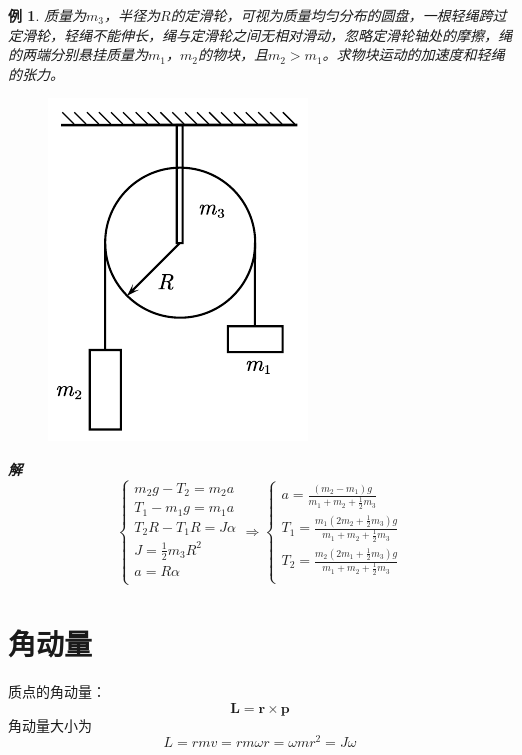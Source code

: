 \documentclass[12pt, a4paper, twoside]{ctexbook}
\newtheorem{example}[theorem]{例}
\begin{document}
\begin{example}
    质量为$m_3$，半径为$R$的定滑轮，可视为质量均匀分布的圆盘，一根轻绳跨过定滑轮，轻绳不能伸长，绳与定滑轮之间无相对滑动，忽略定滑轮轴处的摩擦，绳的两端分别悬挂质量为$m_1$，$m_2$的物块，且$m_2>m_1$。求物块运动的加速度和轻绳的张力。
    \begin{figure}[H]
        \centerline{\includegraphics[scale=0.8]{CH03EX02.pdf}}
    \end{figure}
    \noindent\textbf{解}
    $$
    \left\{ \begin{array}{l}
        m_2g-T_2=m_2a\\
        T_1-m_1g=m_1a\\
        T_2R-T_1R=J\alpha\\
        J=\frac{1}{2}m_3R^2\\
        a=R\alpha\\
    \end{array} \right. \Rightarrow 
    \left\{ \begin{array}{l}
        a=\frac{\left( m_2-m_1 \right) g}{m_1+m_2+\frac{1}{2}m_3}\\
        T_1=\frac{m_1\left( 2m_2+\frac{1}{2}m_3 \right) g}{m_1+m_2+\frac{1}{2}m_3}\\
        T_2=\frac{m_2\left( 2m_1+\frac{1}{2}m_3 \right) g}{m_1+m_2+\frac{1}{2}m_3}\\
    \end{array} \right. 
    $$
\end{example}
\section{角动量}
{\sonti 质点的角动量}：
$$
\boldsymbol{L}=\boldsymbol{r}\times\boldsymbol{p}
$$
角动量大小为
$$
L=rmv=rm\omega r=\omega mr^2=J\omega
$$
\end{document}

